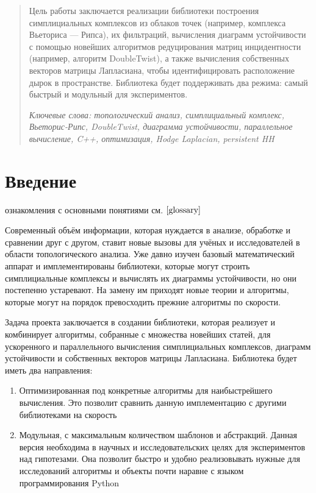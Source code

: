 \documentclass{article}
\begin{document}
\makeTitlePage

\tableofcontents
\newpage
\begin{abstract}
  Цель работы заключается реализации библиотеки построения симплициальных комплексов из облаков точек (например, комплекса Вьеториса — Рипса), их фильтраций, вычисления диаграмм устойчивости с помощью новейших алгоритмов редуцирования матриц инцидентности (например, алгоритм DoubleTwist), а также вычисления собственных векторов матрицы Лапласиана, чтобы идентифицировать расположение дырок в пространстве. Библиотека будет поддерживать два режима: самый быстрый и модульный для экспериментов.

  \textit{Ключевые слова: топологический анализ, симплициальный комплекс, Вьеторис-Рипс, DoubleTwist, диаграмма устойчивости, параллельное вычисление, C++, оптимизация, Hodge Laplacian, persistent HH}
\end{abstract}
\section{Введение}


{ ознакомления с основными понятиями см. $\ref{glossary}$}

Современный объём информации, которая нуждается в анализе, обработке и сравнении друг с другом, ставит новые вызовы для учёных и исследователей в области топологического анализа. Уже давно изучен базовый математический аппарат и имплементированы библиотеки, которые могут строить симплициальные комплексы и вычислять их диаграммы устойчивости, но они постепенно устаревают. На замену им приходят новые теории и алгоритмы, которые могут на порядок превосходить прежние алгоритмы по скорости.

Задача проекта заключается в создании библиотеки, которая реализует и комбинирует алгоритмы, собранные с множества новейших статей, для ускоренного и параллельного вычисления симплициальных комплексов, диаграмм устойчивости и собственных векторов матрицы Лапласиана. Библиотека будет иметь два направления:
\begin{enumerate}
  \item Оптимизированная под конкретные алгоритмы для наибыстрейшего вычисления. Это позволит сравнить данную имплементацию с другими библиотеками на скорость
  \item Модульная, с максимальным количеством шаблонов и абстракций. Данная версия необходима в научных и исследовательских целях для экспериментов над гипотезами. Она позволит быстро и удобно реализовывать нужные для исследований алгоритмы и объекты почти наравне с языком программирования Python
\end{enumerate}
\end{document}
